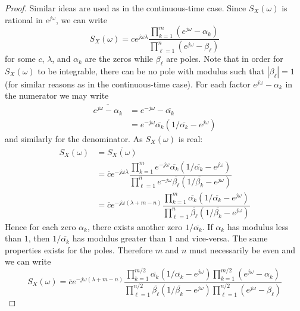 \documentclass[11pt]{report} %
\begin{document}
\begin{proof}
Similar ideas are used as in the continuous-time case. Since $S_{X}\left(\omega\right)$ is rational in $e^{j\omega}$, we can write
\begin{equation}
S_{X}\left(\omega\right) = ce^{j\omega\lambda}\dfrac{\prod_{k = 1}^{m}\left(e^{j\omega} - \alpha_{k}\right)}{\prod_{\ell = 1}^{n}\left(e^{j\omega} - \beta_{\ell}\right)}
\end{equation}
for some $c$, $\lambda$, and $ \alpha_{k}$ are the zeros while $\beta_{\ell}$ are poles. Note that in order for $S_{X}\left(\omega\right)$ to be integrable, there can be no pole with modulus such that $\left|\beta_{\ell}\right| = 1$ (for similar reasons as in the continuous-time case). For each factor $e^{j\omega} - \alpha_{k}$ in the numerator we may write
\begin{align}
\overline{e^{j\omega} - \alpha_{k}} &= e^{-j\omega} - \overline{\alpha_{k}} \\
&= e^{-j\omega}\overline{\alpha_{k}}\left(1/\overline{\alpha_{k}} - e^{j\omega}\right)
\end{align}
and similarly for the denominator. As $S_{X}\left(\omega\right)$ is real:
\begin{align}
S_{X}\left(\omega\right) &= \overline{S_{X}\left(\omega\right)} \\
&= \overline{c}e^{-j\omega\lambda}\dfrac{\prod_{k = 1}^{m}e^{-j\omega}\overline{\alpha_{k}}\left(1/\overline{\alpha_{k}} - e^{j\omega}\right)}{\prod_{\ell = 1}^{n}e^{-j\omega}\overline{\beta_{\ell}}\left(1/\overline{\beta_{k}} - e^{j\omega}\right)} \\
&= \overline{c}e^{-j\omega\left(\lambda + m - n\right)}\dfrac{\prod_{k = 1}^{m}\overline{\alpha_{k}}\left(1/\overline{\alpha_{k}} - e^{j\omega}\right)}{\prod_{\ell = 1}^{n}\overline{\beta_{\ell}}\left(1/\overline{\beta_{k}} - e^{j\omega}\right)}
\end{align}
Hence for each zero $\alpha_{k}$, there exists another zero $1/\overline{\alpha_{k}}$. If $\alpha_{k}$ has modulus less than $1$, then $1/\overline{\alpha_{k}}$ has modulus greater than $1$ and vice-versa. The same properties exists for the poles. Therefore $m$ and $n$ must necessarily be even and we can write
\begin{equation}
S_{X}\left(\omega\right) = \overline{c}e^{-j\omega\left(\lambda + m - n\right)}\dfrac{\prod_{k = 1}^{m/2}\overline{\alpha_{k}}\left(1/\overline{\alpha_{k}} - e^{j\omega}\right)\prod_{k = 1}^{m/2}\left(e^{j\omega} - \alpha_{k}\right)}{\prod_{\ell = 1}^{n/2}\overline{\beta_{\ell}}\left(1/\overline{\beta_{k}} - e^{j\omega}\right)\prod_{\ell = 1}^{n/2}\left(e^{j\omega} - \beta_{\ell}\right)}

\end{equation}
\end{proof}
\end{document}
